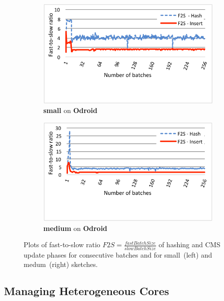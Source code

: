 \documentclass[runningheads]{llncs}
\begin{document}
\begin{figure}[htbp]
	\begin{subfigure}[t]{0.49\textwidth}
		\includegraphics[width=\linewidth]{expfigs/f2s-small.pdf}
		\caption{{\bf small} on {\bf Odroid}}
		\label{fig:fs-small}
	\end{subfigure}\hspace*{3ex}
	\begin{subfigure}[t]{0.49\textwidth}
		\includegraphics[width=\linewidth]{expfigs/f2s-big.pdf}
		\caption{{\bf medium} on {\bf Odroid}}
		\label{fig:fs-large}
	\end{subfigure}
	
	\caption{\small{Plots of fast-to-slow ratio $F2S = \frac{fastBatchSize}{slowBatchSize}$ of hashing and CMS update phases for consecutive batches and for small~(left) and medum~(right) sketches.}}
	\label{fig:load}
	\vspace*{-6ex}
\end{figure}


\subsection{Managing Heterogeneous Cores} 
\end{document}
